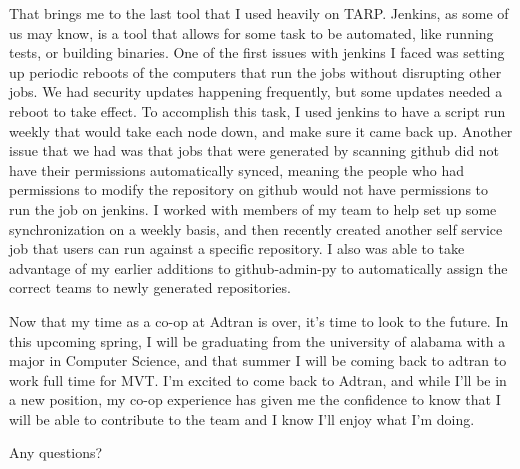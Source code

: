 \documentclass[12pt, letterpaper]{article}
\begin{document}
\par
That brings me to the last tool that I used heavily on TARP. Jenkins, as some of us may know,
is a tool that allows for some task to be automated, like running tests, or building binaries.
One of the first issues with jenkins I faced was setting up periodic reboots of the
computers that run the jobs without disrupting other jobs. We had security updates
happening frequently, but some updates needed a reboot to take effect. To accomplish this task,
I used jenkins to have a script run weekly that would take each node down, and make sure
it came back up. Another issue that we had was that jobs that were generated by
scanning github did not have their permissions automatically synced, meaning the people who had permissions to modify the repository on github
would not have permissions to run the job on jenkins. I worked with members of my team to help set up some synchronization on a weekly basis,
and then recently created another self service job that users can run against
a specific repository. I also was able to take advantage of my earlier additions to github-admin-py to automatically assign the correct teams
to newly generated repositories.

\par
Now that my time as a co-op at Adtran is over, it's time to look to the future.
In this upcoming spring, I will be graduating from the university of alabama with
a major in Computer Science, and that summer I will be coming back to adtran to work full time for MVT. I'm excited to
come back to Adtran, and while I'll be in a new position, my co-op experience has given me
the confidence to know that I will be able to contribute to the team and I know I'll enjoy what I'm doing.

Any questions?
\end{document}
